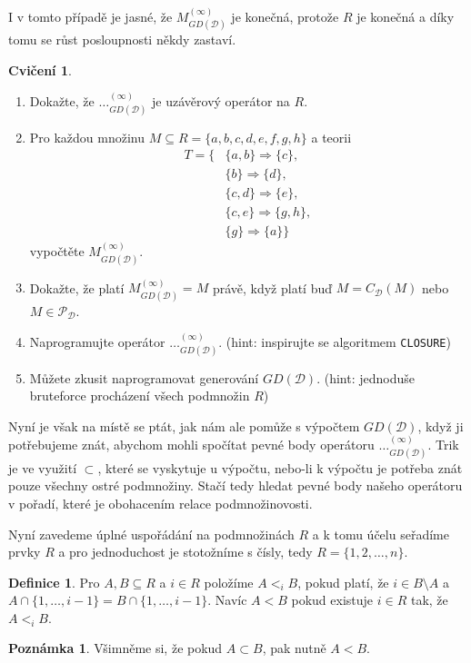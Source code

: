 \documentclass{article}
\theoremstyle {definition}
\newtheorem{definition}{Definice}
\newtheorem*{remark}{Poznámka}
\newtheorem{exercise}{Cvičení}
\begin{document}
I v tomto případě je jasné, že $M^{(\infty)}_{GD(\mathcal{D})}$ je
konečná, protože $R$ je konečná a díky tomu se růst posloupnosti někdy
zastaví.

\begin {exercise}
  \begin {enumerate}
  \item Dokažte, že $\dots^{(\infty)}_{GD(\mathcal{D})}$ je uzávěrový
    operátor na $R$.
  \item Pro každou množinu $M\subseteq R= \{a,b,c,d,e,f,g,h\}$ a
    teorii
    \begin {align*}
      T= \{
      &\{a,b\}\Rightarrow \{c\},\\
      &\{b\}\Rightarrow \{d\},\\
      &\{c,d\}\Rightarrow \{e\},\\
      &\{c,e\}\Rightarrow \{g,h\},\\
      &\{g\}\Rightarrow \{a\}\}
    \end {align*}
    vypočtěte $M^{(\infty)}_{GD(\mathcal{D})}$.
  \item Dokažte, že platí $M^{(\infty)}_{GD(\mathcal{D})} = M$ právě, když
    platí buď $M = C_{\mathcal{D}}(M)$ nebo $M\in \mathcal P_{\mathcal D}$.
  \item Naprogramujte operátor $\dots^{(\infty)}_{GD(\mathcal{D})}$.
    (hint: inspirujte se algoritmem \texttt {CLOSURE})
  \item Můžete zkusit naprogramovat generování $GD(\mathcal{D})$.
    (hint: jednoduše bruteforce procházení všech podmnožin $R$) 
  \end {enumerate}
\end {exercise}

Nyní je však na místě se ptát, jak nám ale pomůže s výpočtem
$GD(\mathcal{D})$, když ji potřebujeme znát, abychom mohli spočítat
pevné body operátoru $\dots^{(\infty)}_{GD(\mathcal{D})}$. Trik je ve
využití $\subset$, které se vyskytuje u výpočtu, nebo-li k výpočtu je
potřeba znát pouze všechny ostré podmnožiny. Stačí tedy hledat pevné
body našeho operátoru v pořadí, které je obohacením relace
podmnožinovosti.

Nyní zavedeme úplné uspořádání na podmnožinách $R$ a k tomu účelu
seřadíme prvky $R$ a pro jednoduchost je stotožníme s čísly, tedy
$R=\{1,2,\dots,n\}$.

\begin {definition}
  Pro $A,B\subseteq R$ a $i\in R$ položíme $A<_iB$, pokud
  platí, že $i\in B\setminus A$ a $A\cap \{1,\dots,i-1\} = B\cap
  \{1,\dots,i-1\}$. Navíc $A<B$ pokud existuje $i\in R$ tak, že
  $A<_iB$.
\end {definition}
\begin {remark}
  Všimněme si, že pokud $A\subset B$, pak nutně $A<B$.
\end {remark}
\end{document}
